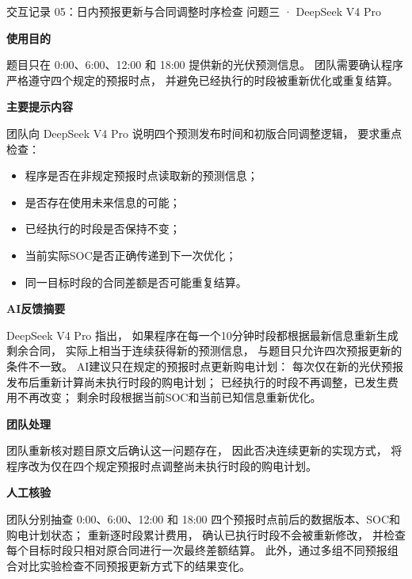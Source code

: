 \documentclass[UTF8,a4paper,11pt]{ctexart}
\newcommand{\recorditem}[1]{%
    \par\vspace{0.28em}
    \noindent\textbf{#1}\quad
}
\begin{document}
\begin{recordbox}
{交互记录 05：日内预报更新与合同调整时序检查}
{问题三 · DeepSeek V4 Pro}

\recorditem{使用目的}
题目只在
0:00、6:00、12:00 和 18:00
提供新的光伏预测信息。
团队需要确认程序严格遵守四个规定的预报时点，
并避免已经执行的时段被重新优化或重复结算。

\recorditem{主要提示内容}
团队向 DeepSeek V4 Pro 说明四个预测发布时间和初版合同调整逻辑，
要求重点检查：
\begin{itemize}
    \item 程序是否在非规定预报时点读取新的预测信息；
    \item 是否存在使用未来信息的可能；
    \item 已经执行的时段是否保持不变；
    \item 当前实际SOC是否正确传递到下一次优化；
    \item 同一目标时段的合同差额是否可能重复结算。
\end{itemize}

\recorditem{AI反馈摘要}
DeepSeek V4 Pro 指出，
如果程序在每一个10分钟时段都根据最新信息重新生成剩余合同，
实际上相当于连续获得新的预测信息，
与题目只允许四次预报更新的条件不一致。
AI建议只在规定的预报时点更新购电计划：
每次仅在新的光伏预报发布后重新计算尚未执行时段的购电计划；
已经执行的时段不再调整，已发生费用不再改变；
剩余时段根据当前SOC和当前已知信息重新优化。

\recorditem{团队处理}
团队重新核对题目原文后确认这一问题存在，
因此否决连续更新的实现方式，
将程序改为仅在四个规定预报时点调整尚未执行时段的购电计划。

\recorditem{人工核验}
团队分别抽查
0:00、6:00、12:00 和 18:00
四个预报时点前后的数据版本、SOC和购电计划状态；
重新逐时段累计费用，
确认已执行时段不会被重新修改，
并检查每个目标时段只相对原合同进行一次最终差额结算。
此外，通过多组不同预报组合对比实验检查不同预报更新方式下的结果变化。
\end{recordbox}
\end{document}
